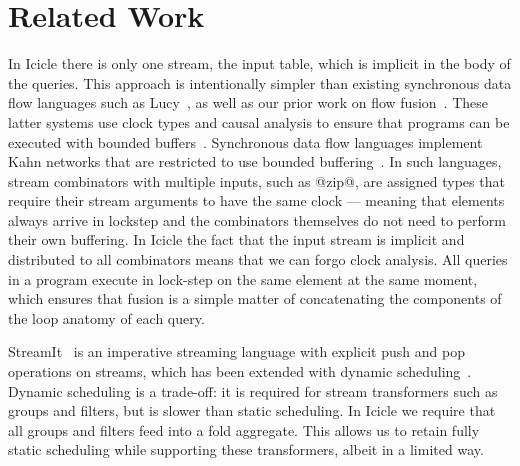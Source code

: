 \eject
\section{Related Work}
\label{s:Conclusion}


In Icicle there is only one stream, the input table, which is implicit in the body of the queries. This approach is intentionally simpler than existing synchronous data flow languages such as Lucy~\cite{mandel2010lucy}, as well as our prior work on flow fusion~\cite{lippmeier2013data}.
These latter systems use clock types and causal analysis to ensure that programs can be executed with bounded buffers~\cite{stephens1997survey}. Synchronous data flow languages implement Kahn networks that are restricted to use bounded buffering~\cite{johnston2004advances}.
In such languages, stream combinators with multiple inputs, such as @zip@, are assigned types that require their stream arguments to have the same clock --- meaning that elements always arrive in lockstep and the combinators themselves do not need to perform their own buffering. In Icicle the fact that the input stream is implicit and distributed to all combinators means that we can forgo clock analysis. All queries in a program execute in lock-step on the same element at the same moment, which ensures that fusion is a simple matter of concatenating the components of the loop anatomy of each query.

StreamIt~\cite{thies2002streamit} is an imperative streaming language with explicit push and pop operations on streams, which has been extended with dynamic scheduling~\cite{soule2013dynamic}. 
Dynamic scheduling is a trade-off: it is required for stream transformers such as groups and filters, but is slower than static scheduling.
In Icicle we require that all groups and filters feed into a fold aggregate.
This allows us to retain fully static scheduling while supporting these transformers, albeit in a limited way.

